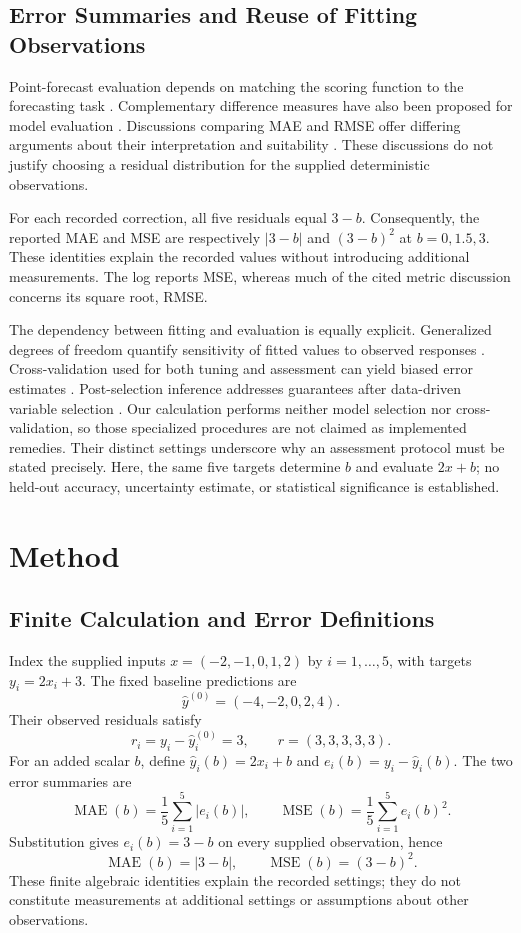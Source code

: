 \documentclass[11pt]{article}
\begin{document}
\subsection{Error Summaries and Reuse of Fitting Observations}

Point-forecast evaluation depends on matching the scoring function to the forecasting task \cite{Gneiting2011MakingEvaluating}. Complementary difference measures have also been proposed for model evaluation \cite{Willmott1985StatisticsEvaluation}. Discussions comparing MAE and RMSE offer differing arguments about their interpretation and suitability \cite{Willmott2005AdvantagesMean,Chai2014RootMean,Hodson2022RootmeansquareError}. These discussions do not justify choosing a residual distribution for the supplied deterministic observations.

For each recorded correction, all five residuals equal $3-b$. Consequently, the reported MAE and MSE are respectively $|3-b|$ and $(3-b)^2$ at $b=0,1.5,3$. These identities explain the recorded values without introducing additional measurements. The log reports MSE, whereas much of the cited metric discussion concerns its square root, RMSE.

The dependency between fitting and evaluation is equally explicit. Generalized degrees of freedom quantify sensitivity of fitted values to observed responses \cite{Ye1998MeasuringCorrecting}. Cross-validation used for both tuning and assessment can yield biased error estimates \cite{Varma2006BiasError}. Post-selection inference addresses guarantees after data-driven variable selection \cite{Berk2013ValidPostselection}. Our calculation performs neither model selection nor cross-validation, so those specialized procedures are not claimed as implemented remedies. Their distinct settings underscore why an assessment protocol must be stated precisely. Here, the same five targets determine $b$ and evaluate $2x+b$; no held-out accuracy, uncertainty estimate, or statistical significance is established.

\section{Method}

\subsection{Finite Calculation and Error Definitions}

Index the supplied inputs $x=(-2,-1,0,1,2)$ by $i=1,\ldots,5$, with targets $y_i=2x_i+3$. The fixed baseline predictions are
\[
\hat{y}^{(0)}=(-4,-2,0,2,4).
\]
Their observed residuals satisfy
\[
r_i=y_i-\hat{y}^{(0)}_i=3,
\qquad r=(3,3,3,3,3).
\]
For an added scalar $b$, define $\hat{y}_i(b)=2x_i+b$ and $e_i(b)=y_i-\hat{y}_i(b)$. The two error summaries are
\[
\operatorname{MAE}(b)=\frac{1}{5}\sum_{i=1}^{5}|e_i(b)|,
\qquad
\operatorname{MSE}(b)=\frac{1}{5}\sum_{i=1}^{5}e_i(b)^2.
\]
Substitution gives $e_i(b)=3-b$ on every supplied observation, hence
\[
\operatorname{MAE}(b)=|3-b|,
\qquad
\operatorname{MSE}(b)=(3-b)^2.
\]
These finite algebraic identities explain the recorded settings; they do not constitute measurements at additional settings or assumptions about other observations.
\end{document}
